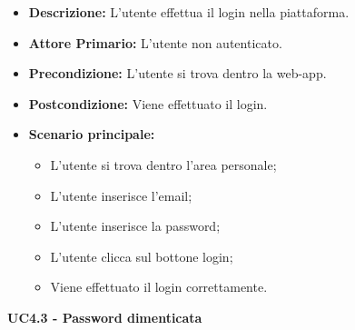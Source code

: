 \begin{itemize}
    \item \textbf{Descrizione:} L'utente effettua il login nella piattaforma.
    \item \textbf{Attore Primario:} L'utente non autenticato.
    \item \textbf{Precondizione:} L'utente si trova dentro la web-app.
    \item \textbf{Postcondizione:} Viene effettuato il login.
    \item \textbf{Scenario principale:}
    \begin{itemize}
        \item L'utente si trova dentro l'area personale;
        \item L'utente inserisce l'email;
        \item L'utente inserisce la password;
        \item L'utente clicca sul bottone login;
        \item Viene effettuato il login correttamente.
    \end{itemize}
\end{itemize}
\textbf{UC4.3 - Password dimenticata}
